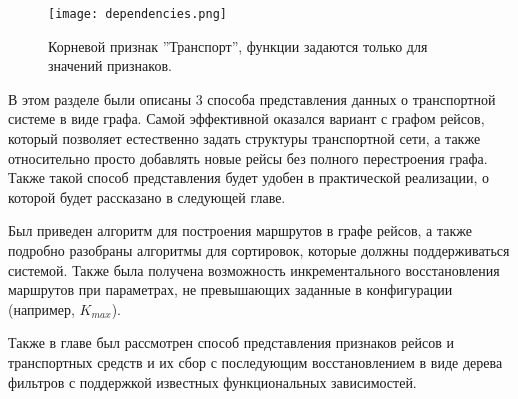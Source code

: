 \begin{figure}[!h]
	\centering
	\texttt{[image: dependencies.png]}
	\caption{Корневой признак ''Транспорт'', функции задаются только для значений признаков.}\label{fig8}
\end{figure}

\chapterconclusion
В этом разделе были описаны 3 способа представления данных о транспортной системе в виде графа. Самой эффективной оказался вариант с графом рейсов, который позволяет естественно задать структуры транспортной сети, а также относительно просто добавлять новые рейсы без полного перестроения графа. Также такой способ представления будет удобен в практической реализации, о которой будет рассказано в следующей главе.

Был приведен алгоритм для построения маршрутов в графе рейсов, а также подробно разобраны алгоритмы для сортировок, которые должны поддерживаться системой. Также была получена возможность инкрементального восстановления маршрутов при параметрах, не превышающих заданные в конфигурации (например, $K_{max}$).

Также в главе был рассмотрен способ представления признаков рейсов и транспортных средств и их сбор с последующим восстановлением в виде дерева фильтров с поддержкой известных функциональных зависимостей.